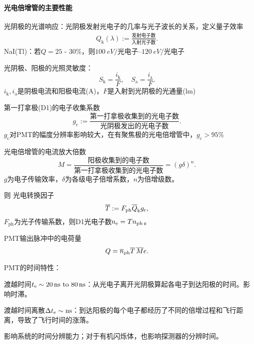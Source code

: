 \paragraph{光电倍增管的主要性能}
\begin{compactitem}
	\item 光阴极的光谱响应：光阴极发射光电子的几率与光子波长的关系，定义量子效率
	\begin{align}
		Q_\mathrm k(\lambda):=\frac{\text{发射电子数}}{\text{入射光子数}}.
	\end{align}
	NaI(Tl)：若$Q=25$ - 30\%，则$\SIrange{100}{120}{eV/\text{光电子}}$
	\item 光阴极、阳极的光照灵敏度：
	\[
		S_\mathrm k=\frac{i_\mathrm k}F,\quad S_\mathrm a=\frac{i_\mathrm a}F.
	\]
	$i_\mathrm k,i_\mathrm a$是阴极电流和阳极电流(A)，$F$是入射到光阴极的光通量(lm)
	\item 第一打拿极(D1)的电子收集系数
	\[
		g_\mathrm c:=\frac{\text{第一打拿极收集到的光电子数}}{\text{光阴极发出的光电子数}}.
	\]
	$g_\mathrm c$对PMT的幅度分辨率影响较大，在有聚焦极的光电倍增管中，$g_\mathrm c>95\%$
	\item 光电倍增管的电流放大倍数
	\[
		M=\frac{\text{阳极收集到的电子数}}{\text{第一打拿极收集到的光电子数}}=(g\delta)^n.
	\]
	$g$为电子传输效率，$\delta$为各级电子倍增系数，$n$为倍增级数。
\end{compactitem}
则%
光电转换因子
\[
	\avg T:=F_{\mathrm{ph}}\avg Q_\mathrm kg_\mathrm c,
\]
$F_{\mathrm{ph}}$为光子传输系数，则D1光电子数$n_\elc=Tn_{\mathrm{ph}}$。

PMT输出脉冲中的电荷量
\begin{align}
	Q=\avg n_{\mathrm{ph}}\avg T\,\avg Me.
\end{align}
\begin{compactitem}
	\item PMT的时间特性：
	\begin{compactitem}
		\item 渡越时间$t_\elc\sim\SIrange{20}{80}{ns}$：从光电子离开光阴极算起各电子到达阳极的时间。影响时滞。
		\item 渡越时间离散$\D t_\elc\sim\si{ns}$：到达阳极的每个电子都经历了不同的倍增过程和飞行距离，导致了飞行时间的涨落。
		
		影响系统的时间分辨能力；对于有机闪烁体，也影响探测器的分辨时间。
	\end{compactitem}
\end{compactitem}

